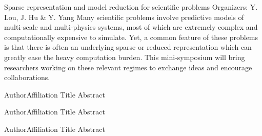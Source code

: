 \label{mini08}

\miniabs
{Sparse representation and model reduction for scientific problems}
{Organizers: Y. Lou, J. Hu \& Y. Yang}
{Many scientific problems involve predictive models of multi-scale and multi-physics systems, most of which are extremely complex and computationally expensive to simulate. Yet, a common feature of these problems is that there is often an underlying sparse or reduced representation which can greatly ease the heavy computation burden. This mini-symposium will bring researchers working on these relevant regimes to exchange ideas and encourage collaborations.}
\vspace{2ex}



\abs
{Author}{Affiliation}
{Title}
{Abstract
}

\vspace{1.5ex}

\abs
{Author}{Affiliation}
{Title}
{Abstract
}

\vspace{1.5ex}

\abs
{Author}{Affiliation}
{Title}
{Abstract
}
